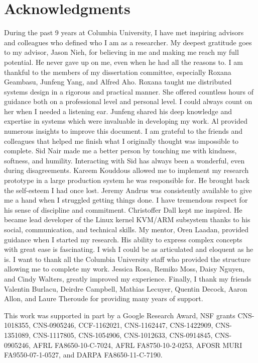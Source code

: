 \chapter*{Acknowledgments}
\label{ch:acks}

During the past 9 years at Columbia University, I have met inspiring advisors
and colleagues who defined who I am as a researcher. My deepest gratitude goes
to my advisor, Jason Nieh, for believing in me and making me reach my full
potential. He never gave up on me, even when he had all the reasons to. I am
thankful to the members of my dissertation committee, especially Roxana
Geambasu, Junfeng Yang, and Alfred Aho. Roxana taught me distributed systems
design in a rigorous and practical manner. She offered countless hours of
guidance both on a professional level and personal level. I could always count
on her when I needed a listening ear. Junfeng shared his deep knowledge and
expertise in systems which were invaluable in developing my work. Al provided
numerous insights to improve this document. I am grateful to the friends and
colleagues that helped me finish what I originally thought was impossible to
complete. Sid Nair made me a better person by touching me with kindness,
softness, and humility. Interacting with Sid has always been a wonderful, even
during disagreements. Kareem Kouddous allowed me to implement my research
prototype in a large production system he was responsible for. He brought back
the self-esteem I had once lost. Jeremy Andrus was consistently available to
give me a hand when I struggled getting things done. I have tremendous respect
for his sense of discipline and commitment. Christoffer Dall kept me inspired.
He became lead developer of the Linux kernel KVM/ARM subsystem thanks to his
social, communication, and technical skills. My mentor, Oren Laadan, provided
guidance when I started my research. His ability to express complex concepts
with great ease is fascinating. I wish I could be as articulated and eloquent
as he is. I want to thank all the Columbia University staff who provided the
structure allowing me to complete my work. Jessica Rosa, Remiko Moss, Daisy
Nguyen, and Cindy Walters, greatly improved my experience. Finally, I thank
my friends Valentin Burlacu, Deirdre Campbell, Mathias Lecuyer, Quentin
Decock, Aaron Allon, and Laure Theroude for providing many years of support.

This work was supported in part by a Google Research Award, NSF grants
CNS-1018355, CNS-0905246, CCF-1162021, CNS-1162447, CNS-1422909, CNS-1351089,
CNS-1117805, CNS-1054906, CNS-1012633, CNS-0914845, CNS-0905246, AFRL
FA8650-10-C-7024, AFRL FA8750-10-2-0253, AFOSR MURI FA9550-07-1-0527, and DARPA
FA8650-11-C-7190.
